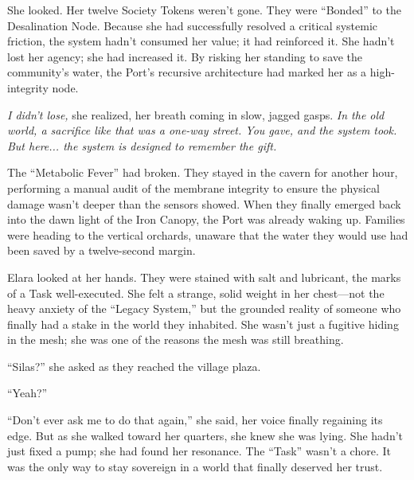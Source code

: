 She looked. Her twelve Society Tokens weren't gone. They were ``Bonded'' to the Desalination Node. Because she had successfully resolved a critical systemic friction, the system hadn't consumed her value; it had reinforced it. She hadn't lost her agency; she had increased it. By risking her standing to save the community's water, the Port's recursive architecture had marked her as a high-integrity node.

\textit{I didn't lose,} she realized, her breath coming in slow, jagged gasps. \textit{In the old world, a sacrifice like that was a one-way street. You gave, and the system took. But here... the system is designed to remember the gift.} 


The ``Metabolic Fever'' had broken. They stayed in the cavern for another hour, performing a manual audit of the membrane integrity to ensure the physical damage wasn't deeper than the sensors showed. When they finally emerged back into the dawn light of the Iron Canopy, the Port was already waking up. Families were heading to the vertical orchards, unaware that the water they would use had been saved by a twelve-second margin.

Elara looked at her hands. They were stained with salt and lubricant, the marks of a Task well-executed. She felt a strange, solid weight in her chest—not the heavy anxiety of the ``Legacy System,'' but the grounded reality of someone who finally had a stake in the world they inhabited. She wasn't just a fugitive hiding in the mesh; she was one of the reasons the mesh was still breathing.

``Silas?'' she asked as they reached the village plaza. 

``Yeah?''

``Don't ever ask me to do that again,'' she said, her voice finally regaining its edge. But as she walked toward her quarters, she knew she was lying. She hadn't just fixed a pump; she had found her resonance. The ``Task'' wasn't a chore. It was the only way to stay sovereign in a world that finally deserved her trust.
